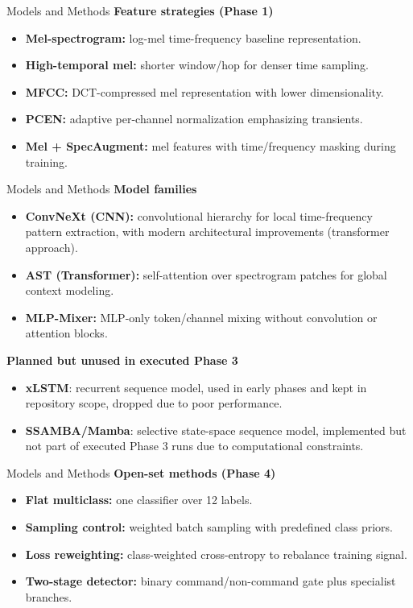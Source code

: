\documentclass[aspectratio=169]{beamer}
\begin{document}
\begin{frame}{Models and Methods}
    \small
    \textbf{Feature strategies (Phase 1)}
    \begin{itemize}
        \item \textbf{Mel-spectrogram:} log-mel time-frequency baseline representation.
        \item \textbf{High-temporal mel:} shorter window/hop for denser time sampling.
        \item \textbf{MFCC:} DCT-compressed mel representation with lower dimensionality.
        \item \textbf{PCEN:} adaptive per-channel normalization emphasizing transients.
        \item \textbf{Mel + SpecAugment:} mel features with time/frequency masking during training.
    \end{itemize}
\end{frame}

\begin{frame}{Models and Methods}
    \small
    \textbf{Model families}
    \begin{itemize}
        \item \textbf{ConvNeXt (CNN):} convolutional hierarchy for local time-frequency pattern extraction, with modern architectural improvements (transformer approach).
        \item \textbf{AST (Transformer):} self-attention over spectrogram patches for global context modeling.
        \item \textbf{MLP-Mixer:} MLP-only token/channel mixing without convolution or attention blocks.
    \end{itemize}
    \vspace{0.2em}
    \textbf{Planned but unused in executed Phase 3}
    \begin{itemize}
        \item \textbf{xLSTM}: recurrent sequence model, used in early phases and kept in repository scope, dropped due to poor performance.
        \item \textbf{SSAMBA/Mamba}: selective state-space sequence model, implemented but not part of executed Phase 3 runs due to computational constraints.
    \end{itemize}
    \vspace{0.2em}
\end{frame}

\begin{frame}{Models and Methods}
    \small
    \textbf{Open-set methods (Phase 4)}
    \begin{itemize}
        \item \textbf{Flat multiclass:} one classifier over 12 labels.
        \item \textbf{Sampling control:} weighted batch sampling with predefined class priors.
        \item \textbf{Loss reweighting:} class-weighted cross-entropy to rebalance training signal.
        \item \textbf{Two-stage detector:} binary command/non-command gate plus specialist branches.
    \end{itemize}
\end{frame}
\end{document}
